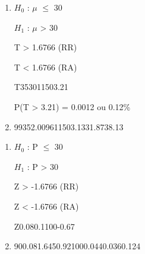 
\begin{question}
    
    \begin{enumerate}[label={\textbf{\alph*)}}]
        
        \item 
        
            $H_0$ : $\mu$ $\leq$ 30 

            $H_1$ : $\mu$ > 30 
        
            T > 1.6766 (RR)

            T < 1.6766 (RA)

            \begin{formula7}
                {T}{35}{30}{11}{50}{3.21}
            \end{formula7}

            P(T > 3.21) = 0.0012 ou 0.12\%

        \item 
    
            \begin{formula2}
                {99}{35}{2.0096}{11}{50}{3.13}{31.87}{38.13}
            \end{formula2}

    \end{enumerate}
\end{question}


\begin{question}
    
    \begin{enumerate}[label={\textbf{\alph*)}}]
        
        \item 
        
            $H_0$ : P $\leq$ 30 

            $H_1$ : P > 30 
        
            Z > -1.6766 (RR)

            Z < -1.6766 (RA)

            \begin{formula8}
                {Z}{0.08}{0.1}{}{100}{-0.67}
            \end{formula8}

        \item 
    
            \begin{formula3}
                {90}{0.08}{1.645}{0.92}{100}{0.044}{0.036}{0.124}
            \end{formula3}

    \end{enumerate}
\end{question}

